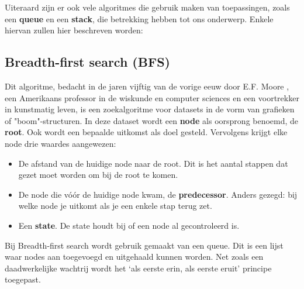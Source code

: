 Uiteraard zijn er ook vele algoritmes die gebruik maken van toepassingen, zoals een \textbf{queue} en een \textbf{stack}, die betrekking hebben tot ons onderwerp. Enkele hiervan zullen hier beschreven worden:

\subsection{Breadth-first search (BFS)}
Dit algoritme, bedacht in de jaren vijftig van de vorige eeuw door E.F. Moore \cite{Moore}, een Amerikaans professor in de wiskunde en computer sciences en een voortrekker in kunstmatig leven, is een zoekalgoritme voor datasets in de vorm van grafieken of "boom"-structuren. In deze dataset wordt een \textbf{node} als oorsprong benoemd, de \textbf{root}. Ook wordt een bepaalde uitkomst als doel gesteld. Vervolgens krijgt elke node drie waardes aangewezen:
\begin{itemize}
\item De afstand van de huidige node naar de root. Dit is het aantal stappen dat gezet moet worden om bij de root te komen.
\item De node die v\'{o}\'{o}r de huidige node kwam, de \textbf{predecessor}. Anders gezegd: bij welke node je uitkomt als je een enkele stap terug zet.
\item Een \textbf{state}. De state houdt bij of een node al gecontroleerd is.
\end{itemize}

Bij Breadth-first search wordt gebruik gemaakt van een queue. Dit is een lijst waar nodes aan toegevoegd en uitgehaald kunnen worden. Net zoals een daadwerkelijke wachtrij wordt het `als eerste erin, als eerste eruit' principe toegepast.

